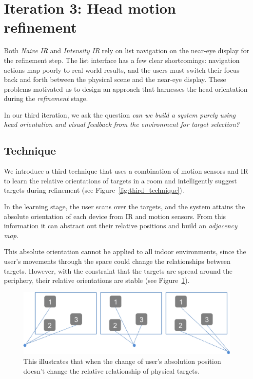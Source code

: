 \section{Iteration 3: Head motion refinement}
\label{sec:iteration-3:-head}

Both {\em Naive IR} and {\em Intensity IR} rely on list navigation on the near-eye display for the refinement step. The list interface has a few clear shortcomings: navigation actions map poorly to real world results, and the users must switch their focus back and forth between the physical scene and the near-eye display. These problems motivated us to design an approach that harnesses the head orientation during the {\em refinement} stage.

In our third iteration, we ask the question {\em can we build a system purely using head orientation and visual feedback from the environment for target selection?}

\subsection{Technique}

We introduce a third technique that uses a combination of motion sensors and IR to learn the relative orientations of
targets in a room and intelligently suggest targets during refinement (see
Figure~\ref{fig:third_technique}).

In the learning stage, the user scans over the targets, and the
system attains the absolute orientation of each device from IR and motion sensors. From this information it can abstract out their relative positions and build an {\em adjacency map}.

This absolute orientation cannot be applied to all indoor
environments, since the user’s movements through the space could change the relationships between targets. However, with the constraint that the targets are spread around the periphery, their relative orientations are stable
(see Figure~\ref{fig:third_principle}). 

\begin{figure}[t]
\centering
\includegraphics[width=1\columnwidth]{figures/third_principle.png}
\caption{This illustrates that when the change of user's absolution position doesn't change the relative relationship of physical targets.}
\label{fig:third_principle}
\end{figure}

